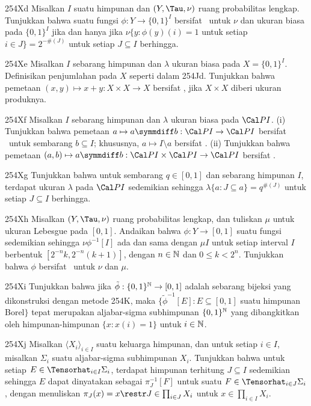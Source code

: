 {\sqheader 254Xd Misalkan $I$ suatu himpunan dan $(Y,\Tau,\nu)$ ruang
probabilitas lengkap. Tunjukkan bahwa suatu fungsi $\phi:Y\to\{0,1\}^I$ bersifat \imp\
untuk $\nu$ dan ukuran biasa pada $\{0,1\}^I$ jika dan hanya jika
$\nu\{y:\phi(y)(i)=1$ untuk setiap $i\in J\}=2^{-\#(J)}$ untuk setiap $J\subseteq I$
berhingga.

\sqheader 254Xe Misalkan $I$ sebarang himpunan dan $\lambda$ ukuran biasa pada
$X=\{0,1\}^I$. Definisikan penjumlahan pada $X$ seperti dalam 254Jd. Tunjukkan bahwa
pemetaan $(x,y)\mapsto x+y:X\times X\to X$ bersifat \imp, jika $X\times X$
diberi ukuran produknya.

\sqheader 254Xf Misalkan $I$ sebarang himpunan dan $\lambda$ ukuran biasa pada
$\Cal PI$. (i) Tunjukkan bahwa pemetaan
$a\mapsto a\symmdiff b:\Cal PI\to\Cal PI$ bersifat \imp\ untuk sembarang
$b\subseteq I$; khususnya, $a\mapsto I\setminus a$ bersifat \imp. (ii)
Tunjukkan bahwa pemetaan
$(a,b)\mapsto a\symmdiff b:\Cal PI\times\Cal PI\to\Cal PI$ bersifat \imp.

\sqheader 254Xg Tunjukkan bahwa untuk sembarang $q\in[0,1]$ dan sebarang himpunan $I$, terdapat
ukuran $\lambda$ pada $\Cal PI$ sedemikian sehingga
$\lambda\{a:J\subseteq a\}=q^{\#(J)}$ untuk setiap $J\subseteq I$ berhingga.

\sqheader 254Xh Misalkan $(Y,\Tau,\nu)$ ruang probabilitas
lengkap, dan tuliskan $\mu$ untuk ukuran Lebesgue pada $[0,1]$. Andaikan bahwa
$\phi:Y\to[0,1]$ suatu fungsi sedemikian sehingga $\nu\phi^{-1}[I]$ ada dan
sama dengan $\mu I$ untuk setiap interval $I$ berbentuk
$[2^{-n}k,2^{-n}(k+1)]$, dengan $n\in\Bbb N$ dan $0\le k<2^n$. Tunjukkan
bahwa $\phi$ bersifat \imp\ untuk $\nu$ dan $\mu$.

\spheader 254Xi Tunjukkan bahwa jika $\tilde\phi:\{0,1\}^{\Bbb N}\to[0,1]$
adalah sebarang bijeksi yang dikonstruksi dengan metode 254K, maka
$\{\tilde\phi^{-1}[E]:E\subseteq[0,1]$ suatu himpunan Borel$\}$ tepat merupakan
aljabar-sigma subhimpunan $\{0,1\}^{\Bbb N}$ yang dibangkitkan oleh himpunan-himpunan
$\{x:x(i)=1\}$ untuk $i\in\Bbb N$.

\spheader 254Xj Misalkan $\langle X_i\rangle_{i\in I}$ suatu keluarga
himpunan, dan untuk setiap $i\in I$, misalkan $\Sigma_i$ suatu aljabar-sigma
subhimpunan $X_i$. Tunjukkan bahwa untuk setiap
$E\in\Tensorhat_{i\in I}\Sigma_i$, terdapat himpunan terhitung
$J\subseteq I$ sedemikian sehingga $E$
dapat dinyatakan sebagai $\pi_J^{-1}[F]$ untuk suatu $F\in\Tensorhat_{i\in J}\Sigma_i$,
dengan menuliskan $\pi_J(x)=x\restr J\in\prod_{i\in J}X_i$ untuk
$x\in\prod_{i\in I}X_i$.

}
